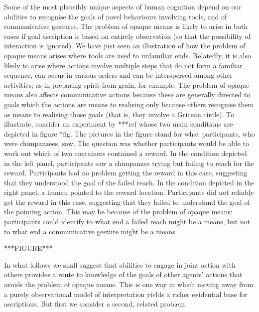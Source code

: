 \documentclass[12pt,a4paper]{extarticle}
\begin{document}
Some of the most plausibly unique aspects of human cognition depend on our abilities to recognise the goals of novel behaviours involving tools, and of communicative gestures.
The problem of opaque means is likely to arise in both cases 
if goal ascription is based on entirely observation 
(so that the possibility of interaction is ignored).
We have just seen an illustration of how the problem of opaque means arises where tools are used to unfamiliar ends.
Relatedly, it is also likely to arise where actions involve multiple steps that do not form a familiar sequence, can occur in various orders and can be interspersed among other activities;
as in preparing spirit from grain, for example.
 The problem of opaque means also affects communicative actions 
 because these are generally  directed to goals which the actions are means to realising only because others recognise them as means to realising those goals (that is, they involve a Gricean circle). 
To illustrate, consider an experiment by
***ref whose two main conditions are depicted in figure *fig.
The pictures in the figure stand for what participants, who were chimpanzees, saw.
The question was whether participants would be able to work out which of two containers contained a reward.
In the condition depicted in the left panel, participants saw a chimpanzee trying but failing to reach for the reward. 
Participants had no problem getting the reward in this case, suggesting that they understood the goal of the failed reach.
In the condition depicted in the right panel, a human pointed to the reward location.
Participants did not reliably  get the reward in this case, suggesting that they failed to understand the goal of the pointing action.
This may be because of the problem of opaque means: 
participants could identify to what end a failed reach might be a means, but not to what end a communicative gesture might be a means.

***FIGURE***

In what follows we shall suggest that abilities to engage in joint action with others provides a route to knowledge of the goals of other agents' actions  that avoids the problem of opaque means.
This is one way in which moving away from a purely observational model of interpretation yields a richer evidential base for ascriptions.
But first we consider a second, related problem.
\end{document}
